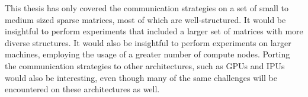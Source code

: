 This thesis has only covered the communication strategies on a set of small to medium sized sparse matrices, most of which are well-structured. It would be insightful to perform experiments that included a larger set of matrices with more diverse structures. It would also be insightful to perform experiments on larger machines, employing the usage of a greater number of compute nodes. Porting the communication strategies to other architectures, such as GPUs and IPUs would also be interesting, even though many of the same challenges will be encountered on these architectures as well.






